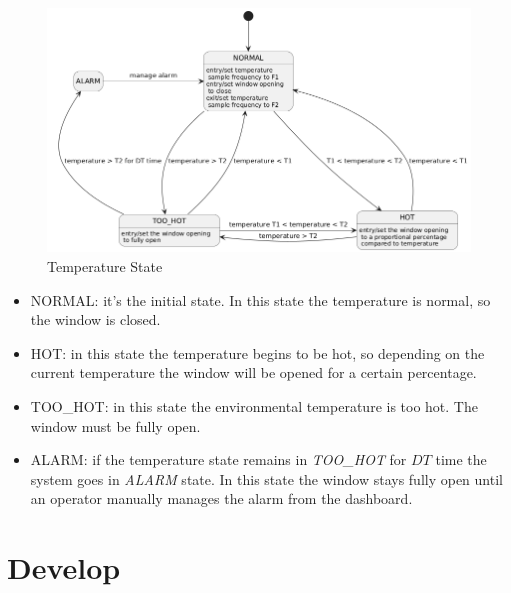 \documentclass[a4paper,12pt]{report}
\begin{document}
            \begin{figure}[H]
                \centering{}
                \includegraphics[width=\textwidth]{uml/img/TemperatureStateUML.png}
                \caption{Temperature State}
                \label{img:temperature_state}
            \end{figure}

            \begin{itemize}
                \item NORMAL: it's the initial state. In this state the temperature is normal, so the window is closed.
                \item HOT: in this state the temperature begins to be hot, so depending on the current temperature the window will be 
                opened for a certain percentage.
                \item TOO\_HOT: in this state the environmental temperature is too hot. The window must be fully open.
                \item ALARM: if the temperature state remains in \textit{TOO\_HOT} for $DT$ time the system goes in \textit{ALARM} 
                state. In this state the window stays fully open until an operator manually manages the alarm from the dashboard.
            \end{itemize}

\chapter{Develop}
\end{document}
